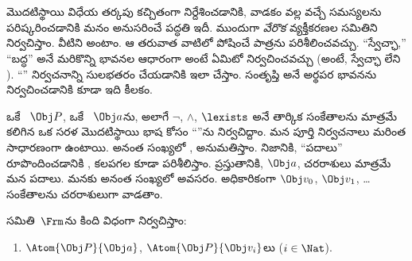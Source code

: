 \documentclass[../../../include/open-logic-section]{subfiles}
\begin{document}

\section{}

మొదటిస్థాయి విధేయ తర్కపు  కచ్చితంగా నిర్దేశించడానికి,
 వాడకం వల్ల వచ్చే సమస్యలను పరిష్కరించడానికి మనం
అనుసరించే పద్ధతి ఇదీ. ముందుగా \emph{వేరొక} వ్యక్తీకరణల సమితిని నిర్వచిస్తాం.
వీటిని  అంటాం. ఆ తరువాత వాటిలో 
పోషించే పాత్రను పరిశీలించవచ్చు. ``స్వేచ్ఛా,'' ``బద్ధ''
 అనే మరికొన్ని భావనల ఆధారంగా  అంటే ఏమిటో
నిర్వచించవచ్చు (అంటే, స్వేచ్ఛా  లేని ).
``'' నిర్వచనాన్ని సులభతరం చేయడానికి ఇలా చేస్తాం. సంతృప్తి అనే అర్థపర
భావనను నిర్వచించడానికి కూడా ఇది కీలకం.

ఒకే ~$\Obj P$, ఒకే ~$\Obj a$ను, అలాగే
$\lnot$, $\land$, $\lexists$ అనే తార్కిక సంకేతాలను మాత్రమే కలిగిన
ఒక సరళ మొదటిస్థాయి భాష కోసం ``''ను నిర్వచిద్దాం. మన పూర్తి
నిర్వచనాలు మరింత సాధారణంగా ఉంటాయి. అనంత సంఖ్యలో ,
 అనుమతిస్తాం. నిజానికి, ``పదాలు'' రూపొందించడానికి
,  కలపగల  కూడా
పరిశీలిస్తాం. ప్రస్తుతానికి, $\Obj a$, చరరాశులు మాత్రమే మన పదాలు.
మనకు అనంత సంఖ్యలో  అవసరం. అధికారికంగా $\Obj v_0$,
$\Obj v_1$, \dots సంకేతాలను చరరాశులుగా వాడతాం.

\begin{defn}
\emph{} సమితి~$\Frm$ను కింది విధంగా నిర్వచిస్తాం:
\begin{enumerate}
\item{} $\Atom{\Obj P}{\Obj a}$, $\Atom{\Obj
  P}{\Obj v_i}$లు  ($i \in \Nat$).




\end{enumerate}
\end{defn}
\end{document}
